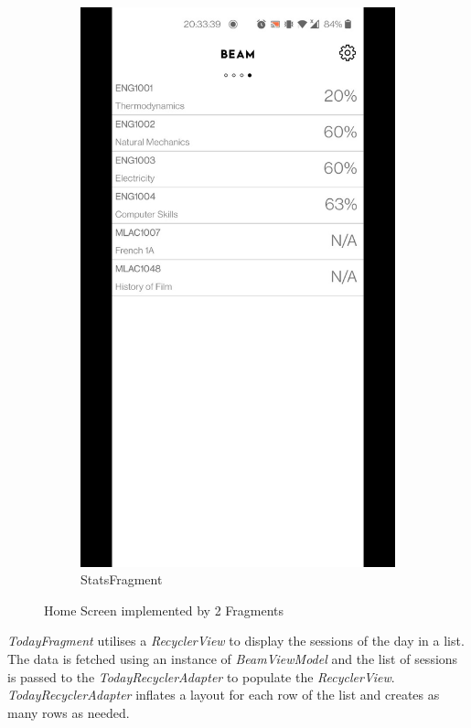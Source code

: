 \documentclass[../report.tex]{subfiles}
\begin{document}
\begin{figure} [H]
\begin{subfigure}[b]{0.28\textwidth}
		\includegraphics[width=\textwidth]{../images/07/02-app-stats.jpg}
		\caption{StatsFragment}
		\label{fig:app-stats-frag}
	\end{subfigure}
	\caption{Home Screen implemented by 2 Fragments}
	\label{fig:app-login-screen}
\end{figure}



\textit{TodayFragment} utilises a \textit{RecyclerView} to display the sessions of the day in a list. The data is fetched using an instance of \textit{BeamViewModel} and the list of sessions is passed to the \textit{TodayRecyclerAdapter} to populate the \textit{RecyclerView}. \textit{TodayRecyclerAdapter} inflates a layout for each row of the list and creates as many rows as needed.
\end{document}
